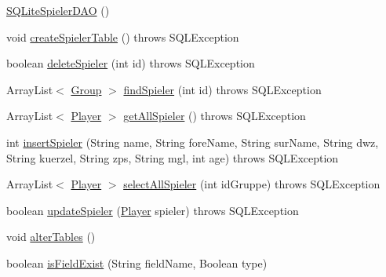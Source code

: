 \begin{DoxyCompactItemize}
\item 
\hyperlink{classde_1_1turnierverwaltung_1_1mysql_1_1_s_q_lite_spieler_d_a_o_a1040949d8f8469f72c078f946432c2b0}{S\+Q\+Lite\+Spieler\+D\+AO} ()
\item 
void \hyperlink{classde_1_1turnierverwaltung_1_1mysql_1_1_s_q_lite_spieler_d_a_o_a5520456e5fafdf5f08cfe202672eccb9}{create\+Spieler\+Table} ()  throws S\+Q\+L\+Exception 
\item 
boolean \hyperlink{classde_1_1turnierverwaltung_1_1mysql_1_1_s_q_lite_spieler_d_a_o_a4c864ea2a396ac744c6a9ea2231eb5e5}{delete\+Spieler} (int id)  throws S\+Q\+L\+Exception 
\item 
Array\+List$<$ \hyperlink{classde_1_1turnierverwaltung_1_1model_1_1_group}{Group} $>$ \hyperlink{classde_1_1turnierverwaltung_1_1mysql_1_1_s_q_lite_spieler_d_a_o_a39a0e861396a212ec140f9fe1709d3eb}{find\+Spieler} (int id)  throws S\+Q\+L\+Exception 
\item 
Array\+List$<$ \hyperlink{classde_1_1turnierverwaltung_1_1model_1_1_player}{Player} $>$ \hyperlink{classde_1_1turnierverwaltung_1_1mysql_1_1_s_q_lite_spieler_d_a_o_a40cfd8516a5ad3fc62ad607233484587}{get\+All\+Spieler} ()  throws S\+Q\+L\+Exception 
\item 
int \hyperlink{classde_1_1turnierverwaltung_1_1mysql_1_1_s_q_lite_spieler_d_a_o_aacc994f03119dc36f4012ad196506e39}{insert\+Spieler} (String name, String fore\+Name, String sur\+Name, String dwz, String kuerzel, String zps, String mgl, int age)  throws S\+Q\+L\+Exception 
\item 
Array\+List$<$ \hyperlink{classde_1_1turnierverwaltung_1_1model_1_1_player}{Player} $>$ \hyperlink{classde_1_1turnierverwaltung_1_1mysql_1_1_s_q_lite_spieler_d_a_o_a570500fee3c47622961b3fe5c56fe911}{select\+All\+Spieler} (int id\+Gruppe)  throws S\+Q\+L\+Exception 
\item 
boolean \hyperlink{classde_1_1turnierverwaltung_1_1mysql_1_1_s_q_lite_spieler_d_a_o_a7e916fe1070834d11d4636d31d6d3b11}{update\+Spieler} (\hyperlink{classde_1_1turnierverwaltung_1_1model_1_1_player}{Player} spieler)  throws S\+Q\+L\+Exception 
\item 
void \hyperlink{classde_1_1turnierverwaltung_1_1mysql_1_1_s_q_lite_spieler_d_a_o_a84323c964eeaaa19021bf73cb9bab46f}{alter\+Tables} ()
\item 
boolean \hyperlink{classde_1_1turnierverwaltung_1_1mysql_1_1_s_q_lite_spieler_d_a_o_a70831c5454539bac485ac14d197e3110}{is\+Field\+Exist} (String field\+Name, Boolean type)
\end{DoxyCompactItemize}


